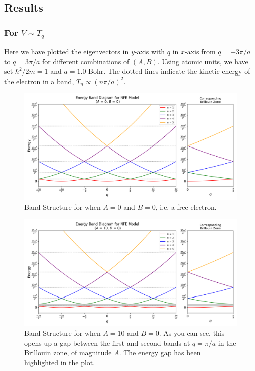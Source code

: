 \documentclass[12pt,a4paper]{article}
\begin{document}
\subsection{Results}
\subsubsection{For $V \sim T_q$}

Here we have plotted the eigenvectors in $y$-axis with $q$ in $x$-axis from $q = -3 \pi/a$ to $q= 3\pi/a$  for different combinations of $(A,B)$. 
Using atomic units, we have set $\hbar^2/2m = 1$ and $a=1.0$ Bohr. The dotted lines indicate the kinetic energy of the electron in a band, $T_n \propto (n\pi/a)^2$.

\begin{figure}[H]
    \centering
    \includegraphics[width=1\linewidth]{images/1.png}
    \caption{Band Structure for when $A=0$ and $B=0$, i.e. a free electron.}
    \label{1}
\end{figure}

\begin{figure}[H]
    \centering
    \includegraphics[width=1\linewidth]{images/2.png}
    \caption{Band Structure for when $A=10$ and $B=0$. As you can see, this opens up a gap between the first and second bands at $q=\pi/a$ in the Brillouin zone, of magnitude $A$. The energy gap has been highlighted in the plot.}
    \label{2}
\end{figure}
\end{document}
